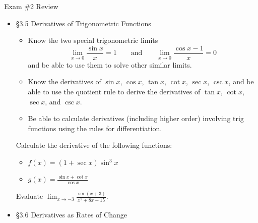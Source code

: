 \documentclass[cal1spr16Lectures.tex]{subfiles}
\begin{document}
\begin{frame}[allowframebreaks]{Exam \#2 Review}
\begin{itemize}
{\bf Note:} Functions are not always given by a formula.  When faced with a problem where you don't know where to start, go through the rules first.
%
\framebreak
\begin{exe} Suppose you have the following information about the functions $f$ and $g$:
\[f(1)=6\quad f'(1)=2\quad g(1)=2\quad g'(1)=3\]
\vspace{-1pc}	
	\begin{itemize}\footnotesize
	\item Let $F=2f+3g$.  What is $F(1)$?  What is $F'(1)$?
	\item Let $G=fg$.  What is $G(1)$?  What is $G'(1)$?
	\end{itemize}
\end{exe}
%
\framebreak
\item \S 3.5 Derivatives of Trigonometric Functions
	\begin{itemize}\footnotesize
	\item Know the two special trigonometric limits
	\vspace{-0.5pc}
	\[\lim_{x\to 0}\frac{\sin x}{x}=1\qquad\text{and}\qquad\lim_{x\to 0}\frac{\cos x-1}{x}=0\]
	and be able to use them to solve other similar limits.
	\item Know the derivatives of $\sin x$, $\cos x$, $\tan x$, $\cot x$, $\sec x$, $\csc x$, and be able to use the quotient rule to derive the derivatives of $\tan x$, $\cot x$, $\sec x$, and $\csc x$.
	\item Be able to calculate derivatives (including higher order) involving trig functions using the rules for differentiation.
	\end{itemize}
%
\framebreak
\begin{exe}
Calculate the derivative of the following functions:
\begin{itemize}
\item $f(x)=(1+\sec x)\sin^3x$
%
\item $g(x)=\displaystyle\frac{\sin x+\cot x}{\cos x}$
\end{itemize}
\end{exe}
%
%
\begin{exe} Evaluate $\displaystyle\lim_{x\to -3}\frac{\sin{(x+3)}}{x^2+8x+15}$. \end{exe}
%
%
\framebreak
\item \S 3.6 Derivatives as Rates of Change

\end{itemize}
\end{frame}
\end{document}
